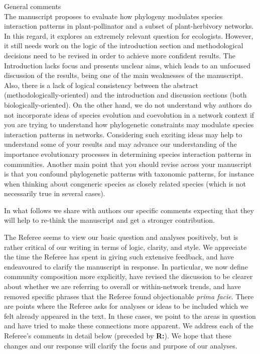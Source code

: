 \documentclass[12pt]{letter}
\newenvironment{refquote}{\bigskip \begin{it}}{\end{it}\smallskip}
\begin{document}
	\begin{refquote}
	General comments\\

	The manuscript proposes to evaluate how phylogeny modulates species interaction patterns in plant-pollinator and a subset of plant-herbivory networks. In this regard, it explores an extremely relevant question for ecologists. However, it still needs work on the logic of the introduction section and methodological decisions need to be revised in order to achieve more confident results. The Introduction lacks focus and presents unclear aims, which leads to an unfocused discussion of the results, being one of the main weaknesses of the manuscript. Also, there is a lack of logical consistency between the abstract (methodologically-oriented) and the introduction and discussion sections (both biologically-oriented). On the other hand, we do not understand why authors do not incorporate ideas of species evolution and coevolution in a network context if you are trying to understand how phylogenetic constraints may modulate species interaction patterns in networks. Considering such exciting ideas may help to understand some of your results and may advance our understanding of  the importance evolutionary processes in determining species interaction patterns in communities.
	Another main point that you should revise across your manuscript is that you confound phylogenetic patterns with taxonomic patterns, for instance when thinking about congeneric species as closely related species (which is not necessarily true in several cases).

	\smallskip

	In what follows we share with authors our specific comments expecting that they will help to re-think the manuscript and get a stronger contribution.

	\end{refquote}


	The Referee seems to view our basic question and analyses positively, but is rather critical of our writing in terms of logic, clarity, and style. We appreciate the time the Referee has spent in giving such extensive feedback, and have endeavoured to clarify the manuscript in response. In particular, we now define community composition more explicitly, have revised the discussion to be clearer about whether we are referring to overall or within-network trends, and have removed specific phrases that the Referee found objectionable \emph{prima facie}. There are points where the Referee asks for analyses or ideas to be included which we felt already appeared in the text. In these cases, we point to the areas in question and have tried to make these connections more apparent. 	
	We address each of the Referee's comments in detail below (preceded by \textbf{R:}). We hope that these changes and our response will clarify the focus and purpose of our analyses.
\end{document}
